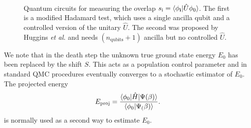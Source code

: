 \documentclass[%
 reprint,
 amsmath,amssymb,
 aps,
]{revtex4-2}
\begin{document}
\begin{figure}
    \centering
{}\\
    \caption{\small \justifying Quantum circuits for measuring the overlap $s_\mathrm{i} = \braket{\phi_\mathbf{i}|\hat U \phi_0}$. The first is a modified Hadamard test,\cite{quantumalgorithms} which uses a single ancilla qubit and a controlled version of the unitary $\hat U$. The second was proposed by Huggins \textit{et al.}\cite{Huggins2020} and needs $(n_\mathrm{qubits} + 1)$ ancilla but no controlled $\hat U$.}
    \label{fig:circs}
\end{figure}

We note that in the death step the unknown true ground state energy $E_0$ has been replaced by the shift $S$. This acts as a population control parameter and in standard QMC procedures eventually converges to a stochastic estimator of $E_0$.\cite{Booth2009} The projected energy
\begin{equation}
    E_\mathrm{proj} = \frac{\braket{\phi_0|\hat H| \Psi(\beta)}}{\braket{\phi_0|\Psi_(\beta)}}.
    \label{eq:e_proj}
\end{equation}
is normally used as a second way to estimate $E_0$.
\end{document}
